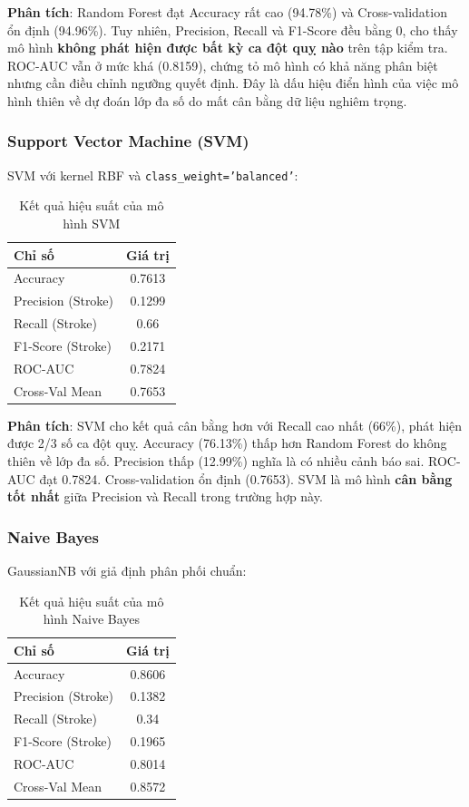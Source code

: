 ﻿\documentclass{article}
\begin{document}
\textbf{Phân tích}: Random Forest đạt Accuracy rất cao (94.78\%) và Cross-validation ổn định (94.96\%). Tuy nhiên, Precision, Recall và F1-Score đều bằng 0, cho thấy mô hình \textbf{không phát hiện được bất kỳ ca đột quỵ nào} trên tập kiểm tra. ROC-AUC vẫn ở mức khá (0.8159), chứng tỏ mô hình có khả năng phân biệt nhưng cần điều chỉnh ngưỡng quyết định. Đây là dấu hiệu điển hình của việc mô hình thiên về dự đoán lớp đa số do mất cân bằng dữ liệu nghiêm trọng.

\subsubsection{Support Vector Machine (SVM)}
SVM với kernel RBF và \texttt{class\_weight='balanced'}:

\begin{table}[h]
\centering
\begin{tabular}{|l|c|}
\hline
\textbf{Chỉ số} & \textbf{Giá trị} \\
\hline
Accuracy & 0.7613 \\
Precision (Stroke) & 0.1299 \\
Recall (Stroke) & 0.66 \\
F1-Score (Stroke) & 0.2171 \\
ROC-AUC & 0.7824 \\
Cross-Val Mean & 0.7653 \\
\hline
\end{tabular}
\caption{Kết quả hiệu suất của mô hình SVM}
\label{tab:svm_performance}
\end{table}

\textbf{Phân tích}: SVM cho kết quả cân bằng hơn với Recall cao nhất (66\%), phát hiện được 2/3 số ca đột quỵ. Accuracy (76.13\%) thấp hơn Random Forest do không thiên về lớp đa số. Precision thấp (12.99\%) nghĩa là có nhiều cảnh báo sai. ROC-AUC đạt 0.7824. Cross-validation ổn định (0.7653). SVM là mô hình \textbf{cân bằng tốt nhất} giữa Precision và Recall trong trường hợp này.

\subsubsection{Naive Bayes}
GaussianNB với giả định phân phối chuẩn:

\begin{table}[h]
\centering
\begin{tabular}{|l|c|}
\hline
\textbf{Chỉ số} & \textbf{Giá trị} \\
\hline
Accuracy & 0.8606 \\
Precision (Stroke) & 0.1382 \\
Recall (Stroke) & 0.34 \\
F1-Score (Stroke) & 0.1965 \\
ROC-AUC & 0.8014 \\
Cross-Val Mean & 0.8572 \\
\hline
\end{tabular}
\caption{Kết quả hiệu suất của mô hình Naive Bayes}
\label{tab:nb_performance}
\end{table}
\end{document}
